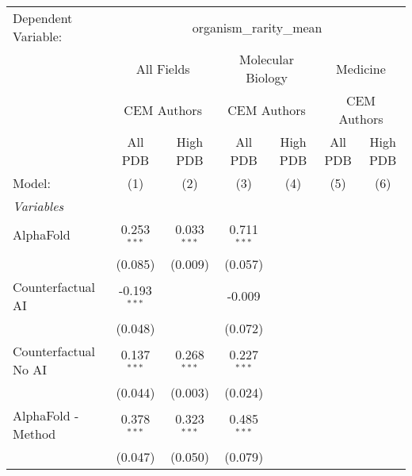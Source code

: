 \begingroup
\centering
\begin{tabular}{lcccccc}
   \tabularnewline \midrule \midrule
   Dependent Variable: & \multicolumn{6}{c}{organism\_rarity\_mean}\\
 & \multicolumn{2}{c}{All Fields} & \multicolumn{2}{c}{Molecular Biology} & \multicolumn{2}{c}{Medicine} \\
\cmidrule(lr){2-3} \cmidrule(lr){4-5} \cmidrule(lr){6-7}
 & \multicolumn{2}{c}{CEM Authors} & \multicolumn{2}{c}{CEM Authors} & \multicolumn{2}{c}{CEM Authors} \\
\cmidrule(lr){2-3} \cmidrule(lr){4-5} \cmidrule(lr){6-7}
 & \multicolumn{1}{c}{All PDB} & \multicolumn{1}{c}{High PDB} & \multicolumn{1}{c}{All PDB} & \multicolumn{1}{c}{High PDB} & \multicolumn{1}{c}{All PDB} & \multicolumn{1}{c}{High PDB} \\
\cmidrule(lr){2-2} \cmidrule(lr){3-3} \cmidrule(lr){4-4} \cmidrule(lr){5-5} \cmidrule(lr){6-6} \cmidrule(lr){7-7}
   Model:                                                     & (1)            & (2)           & (3)           & (4) & (5) & (6)\\  
   \midrule
   \emph{Variables}\\
   AlphaFold                                                  & 0.253$^{***}$  & 0.033$^{***}$ & 0.711$^{***}$ &     &     &   \\   
                                                              & (0.085)        & (0.009)       & (0.057)       &     &     &   \\   
   Counterfactual AI                                          & -0.193$^{***}$ &               & -0.009        &     &     &   \\   
                                                              & (0.048)        &               & (0.072)       &     &     &   \\   
   Counterfactual No AI                                       & 0.137$^{***}$  & 0.268$^{***}$ & 0.227$^{***}$ &     &     &   \\   
                                                              & (0.044)        & (0.003)       & (0.024)       &     &     &   \\   
   AlphaFold - Method                                         & 0.378$^{***}$  & 0.323$^{***}$ & 0.485$^{***}$ &     &     &   \\   
                                                              & (0.047)        & (0.050)       & (0.079)       &     &     &   \\   

\end{tabular}
